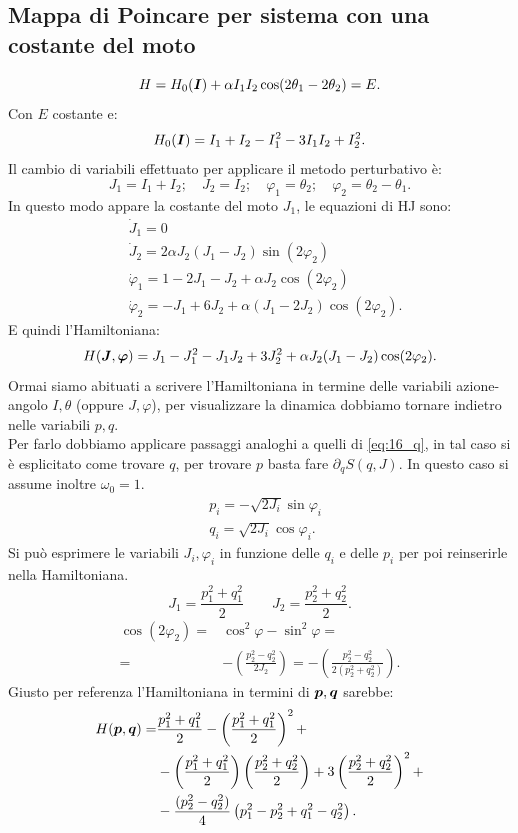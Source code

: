 \subsection{Mappa di Poincare per sistema con una costante del moto}%
\label{sub:Mappa di Poincare per sistema con una costante del moto}
   \[
    H = H_0(\boldsymbol{I})+ \alpha I_1I_2\cos (2\theta_1-2\theta_2) = E
.\] 
Con $E$ costante e: 
\[
    H_0(\boldsymbol{I}) = I_1 + I_2 - I_1^2 - 3I_1I_2 + I_2^2
.\] 
Il cambio di variabili effettuato per applicare il metodo perturbativo è:
\[
    J_1=I_1+I_2; \quad J_2=I_2; \quad \varphi_1 = \theta_2; \quad \varphi_2=\theta_2-\theta_1
.\] 
In questo modo appare la costante del moto $J_1$, le equazioni di HJ sono:
\[\begin{aligned}
    & \dot{J}_1 = 0\\
    & \dot{J}_2 = 2\alpha J_2(J_1-J_2)\sin (2\varphi_2)\\
    & \dot{\varphi}_1 = 1-2J_1-J_2+\alpha J_2\cos (2\varphi_2)\\
    & \dot{\varphi }_2=-J_1+6J_2+\alpha (J_1-2J_2)\cos (2\varphi_2)
.\end{aligned}\]
E quindi l'Hamiltoniana:
\[
    H(\boldsymbol{J},\boldsymbol{\varphi}) = J_1 - J_1^2 - J_1J_2 + 3J_2^2 + \alpha  J_2(J_1-J_2)\cos (2\varphi_2)
.\] 
Ormai siamo abituati a scrivere l'Hamiltoniana in termine delle variabili azione-angolo $I,\theta$ (oppure $J,\varphi$), per visualizzare la dinamica dobbiamo tornare indietro nelle variabili $p, q$. \\
Per farlo dobbiamo applicare passaggi analoghi a quelli di \ref{eq:16_q}, in tal caso si è esplicitato come trovare $q$, per trovare $p$ basta fare $\partial_{q}S(q,J)$. In questo caso si assume inoltre $\omega_0=1$.
\begin{equation}
\begin{aligned}
    & p_i = - \sqrt{2J_i} \sin\varphi_i\\
    & q_i = \sqrt{2J_i} \cos\varphi_i
    \label{eq:18_H_22}
.\end{aligned}\end{equation}
Si può esprimere le variabili $J_i, \varphi_i$ in funzione delle $q_i$ e delle $p_i$ per poi reinserirle nella Hamiltoniana.
\[
    J_1 = \frac{p_1^2+q_1^2}{2} \qquad J_2 = \frac{p_2^2+q_2^2}{2}
.\] 
\[\begin{aligned}
    \cos (2\varphi_2) =& \cos^2\varphi-\sin^2\varphi  =\\
    =& -\left(\frac{p_2^2-q_2^2}{2J_2}\right) = -\left(\frac{p_2^2-q_2^2}{2(p_2^2+q_2^2)}\right)
.\end{aligned}\]
Giusto per referenza l'Hamiltoniana in termini di $\boldsymbol{p}, \boldsymbol{q}$ sarebbe:
\[\begin{aligned}
    H(\boldsymbol{p}, \boldsymbol{q})=& \frac{p_1^2+q_1^2}{2}-\left(\frac{p_1^2+q_1^2}{2}\right)^2 + \\
			  & - \left(\frac{p_1^2+q_1^2}{2}\right)\left(\frac{p_2^2+q_2^2}{2}\right) +3\left(\frac{p_2^2+q_2^2}{2}\right)^2 + \\
			  & - \frac{(p_2^2-q_2^2)}{4}\left(p_1^2-p_2^2 + q_1^2-q_2^2\right)
.\end{aligned}\]
